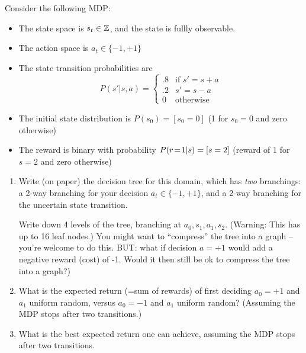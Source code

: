 Consider the following MDP:
\begin{itemize}
\item The state space is $s_t \in \ZZZ$, and the state is fullly observable.
\item The action space is $a_t \in\{-1, +1\}$
\item The state transition probabilities are
$$P(s'|s,a) = \begin{cases} .8
& \text{if~} s'=s+a \\ .2 & s'=s-a \\ 0
& \text{otherwise}\end{cases}$$
\item The initial state distribution is $P(s_0) = [s_0=0]$ (1 for $s_0=0$ and
zero otherwise)
\item The reward is binary with probability $P(r\=1|s) = [s=2]$
(reward of 1 for $s=2$ and zero otherwise)
\end{itemize}

\begin{enumerate}
\item Write (on paper) the decision tree for this domain, which has \emph{two} branchings: a 2-way branching for your decision $a_t\in\{-1,+1\}$, and a 2-way branching for the uncertain state transition.

Write down 4 levels of the tree, branching at $a_0,s_1,a_1,s_2$. (Warning: This has up to 16 leaf nodes.) You might want to ``compress'' the tree into a graph -- you're welcome to do this. BUT: what if decision $a=+1$ would add a negative reward (cost) of -1. Would it then still be ok to compress the tree into a graph?)

\item What is the expected return (=sum of rewards) of first deciding $a_0=+1$ and $a_1$ uniform random, versus $a_0=-1$ and $a_1$ uniform random? (Assuming the MDP stops after two transitions.)

\item What is the best expected return one can achieve, assuming the MDP stops after two transitions.
\end{enumerate}


